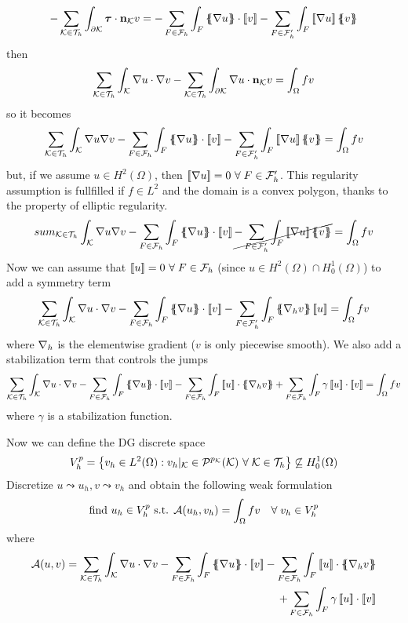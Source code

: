 \[
    -\sum_{\element \in \triangulation} \int_{\partial\element} \bm{\tau} \cdot \vect{n}_{\element} v =- \sum_{F \in \mathcal{F}_h}\int_F\average{\grad u} \cdot \jump{v} - \sum_{F \in \mathcal{F}'_h} \int_{F}\jump{\grad u}\average{v} 
\]
then 
\[
    \sum_{\mathcal{K} \in \mathcal{T}_h} \int_{\mathcal{K}}\nabla u \cdot \nabla v - \sum_{\mathcal{K} \in \mathcal{T}_h} \int_{\partial\mathcal{K}} \nabla u \cdot \textbf{n}_{\mathcal{K}} v = \int_{\Omega} fv
\]
so it becomes 
\[
    \sum_{\element \in \triangulation} \int_{\element} \grad u \grad v - \sum_{F \in \mathcal{F}_h} \int_{F} \average{\grad u} \cdot \jump{v} - \sum_{F \in \mathcal{F}'_h} \int_F \jump{\grad u} \average{v} = \int_{\Omega} fv
\]
but, if we assume \(u \in H^2(\Omega)\), then \(\left[\!\left[\nabla u\right]\!\right] = 0 \ \forall \; F \in \mathcal{F}'_h\). This regularity assumption is fullfilled if \(f \in L^2\) and the domain is a convex polygon, thanks to the property of elliptic regularity.
\[
    sum_{\element \in \triangulation} \int_{\element} \grad u \grad v - \sum_{F \in \mathcal{F}_h} \int_{F} \average{\grad u} \cdot \jump{v} \cancel{- \sum_{F \in \mathcal{F}'_h} \int_F \jump{\grad u} \average{v}} = \int_{\Omega} fv
\]
Now we can assume that \(\left[\!\left[u\right]\!\right] = 0 \ \forall \; F \in \mathcal{F}_h\) (since \(u \in H^2(\Omega) \cap H^1_0(\Omega)\)) to add a symmetry term 
\[
    \sum_{\element \in \triangulation} \int_\element \grad u \cdot \grad v - \sum_{F \in \mathcal{F}_h} \int_F \average{\grad u} \cdot \jump{v} - \sum_{F \in \mathcal{F}'_h} \int_F \average{\grad_h v} \jump{u} = \int_\Omega fv
\] 
where \(\nabla_h\) is the elementwise gradient (\(v\) is only piecewise smooth).
We also add a stabilization term that controls the jumps
\[
    \sum_{\element \in \triangulation} \int_\element \grad u \cdot \grad v  - \sum_{F \in \mathcal{F}_h} \int_F \average{\grad u} \cdot \jump{v} - \sum_{F \in \mathcal{F}_h} \int_F \jump{u} \cdot \average{\grad_h v} + \sum_{F \in \mathcal{F}_h} \int_F \gamma \jump{u} \cdot \jump{v} = \int_\Omega fv
\]
where \(\gamma\) is a stabilization function.

Now we can define the DG discrete space 
\[
    V_h^p = \left\{ v_h \in L^2(\Omega) : v_h\vert_{\mathcal{K}} \in \mathcal{P}^{p_{\mathcal{K}}}(\mathcal{K}) \ \forall \; \mathcal{K} \in \mathcal{T}_h\right\} \not\subseteq H^1_0 (\Omega)
\]
Discretize \(u \leadsto u_h, v \leadsto v_h\) and obtain the following weak formulation
\[
    \text{find } u_h \in V_h^p \text{ s.t. } \mathcal{A}(u_h, v_h) = \int_\Omega fv \quad \forall \;v_h \in V_h^p
\]
where 
\begin{equation*}
    \begin{split}
        \mathcal{A}(u, v) =  \sum_{\element \in \triangulation} \int_\element \grad u \cdot \grad v  - \sum_{F \in \mathcal{F}_h} \int_F \average{\grad u} \cdot \jump{v}  - \sum_{F \in \mathcal{F}_h} \int_F \jump{u} \cdot \average{\grad_h v} \\+ \sum_{F \in \mathcal{F}_h} \int_F \gamma \jump{u} \cdot \jump{v}
    \end{split}
\end{equation*}
